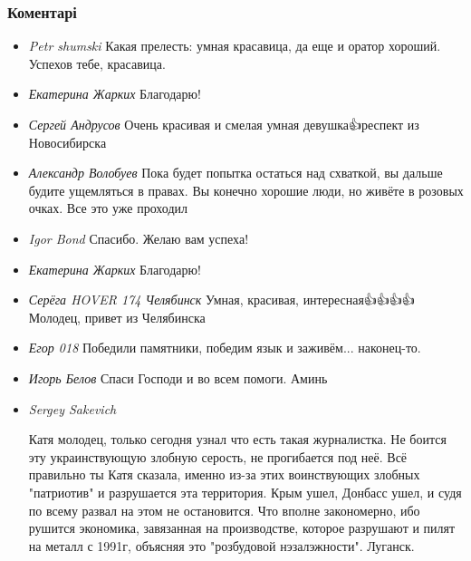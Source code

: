  
 
 
 
 
\subsubsection{Коментарі}

\begin{itemize}

\item \emph{Petr shumski}
Какая прелесть: умная красавица, да еще и оратор хороший. Успехов тебе, красавица.

\item \emph{Екатерина Жарких}
Благодарю!

\item \emph{Сергей Андрусов}
Очень красивая и смелая умная девушка👍респект из Новосибирска

\item \emph{Александр Волобуев}
Пока будет попытка остаться над схваткой, вы дальше будите ущемляться в правах.
Вы конечно хорошие люди, но живёте в розовых очках. Все это уже проходил

\item \emph{Igor Bond}
Спасибо. Желаю вам успеха!

\item \emph{Екатерина Жарких}
Благодарю!

\item \emph{Серёга HOVER 174 Челябинск}
Умная, красивая, интересная👍👍👍👍 Молодец, привет из Челябинска

\item \emph{Егор 018}
Победили памятники, победим язык и заживём... наконец-то.

\item \emph{Игорь Белов}
Спаси Господи и во всем помоги. Аминь

\item \emph{Sergey Sakevich}

Катя молодец, только сегодня узнал что есть такая журналистка. Не боится эту
украинствующую злобную серость, не прогибается под неё. Всё правильно ты Катя
сказала, именно из-за этих воинствующих злобных "патриотив" и разрушается эта
территория. Крым ушел, Донбасс  ушел, и судя по всему развал на этом не
остановится. Что вполне закономерно, ибо рушится экономика, завязанная на
производстве, которое разрушают и пилят на металл с 1991г, объясняя это
"розбудовой нэзалэжности". Луганск.


\end{itemize}

